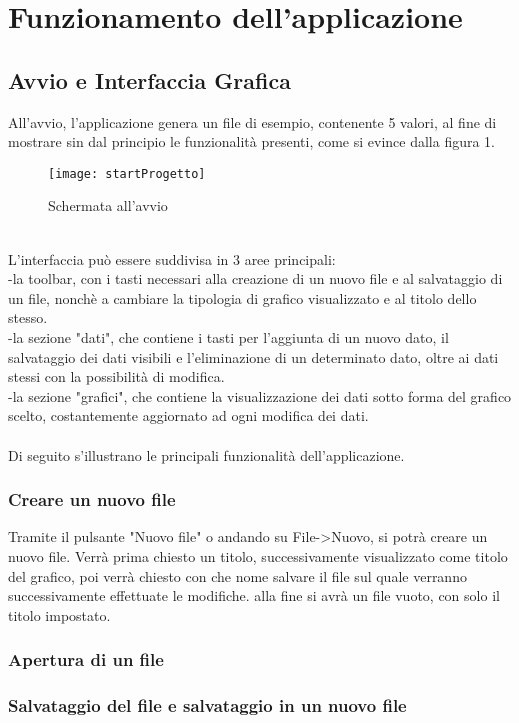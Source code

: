 \documentclass[10pt]{article}
\begin{document}
    \section{Funzionamento dell'applicazione}
    \subsection{Avvio e Interfaccia Grafica}
    All'avvio, l'applicazione genera un file di esempio, contenente 5 valori, al fine di mostrare sin dal principio le funzionalità presenti, come si evince dalla figura 1.
     \begin{figure}[h!]
     	\centering
     	\texttt{[image: startProgetto]}
     	\caption{Schermata all'avvio}
     	\label{fig:startprogetto}
     \end{figure}
 	\\
    L'interfaccia può essere suddivisa in 3 aree principali:\\
    -la toolbar, con i tasti necessari alla creazione di un nuovo file e al salvataggio di un file, nonchè a cambiare la tipologia di grafico visualizzato e al titolo dello stesso.\\
    -la sezione "dati", che contiene i tasti per l'aggiunta di un nuovo dato, il salvataggio dei dati visibili e l'eliminazione di un determinato dato, oltre ai dati stessi con la possibilità di modifica.\\
    -la sezione "grafici", che contiene la visualizzazione dei dati sotto forma del grafico scelto, costantemente aggiornato ad ogni modifica dei dati.\\\\
    Di seguito s'illustrano le principali funzionalità dell'applicazione.
    \subsubsection{Creare un nuovo file}
    Tramite il pulsante "Nuovo file" o andando su File->Nuovo, si potrà creare un nuovo file. Verrà prima chiesto un titolo, successivamente visualizzato come titolo del grafico, poi verrà chiesto con che nome salvare il file sul quale verranno successivamente effettuate le modifiche. alla fine si avrà un file vuoto, con solo il titolo impostato.
    \subsubsection{Apertura di un file}
    \subsubsection{Salvataggio del file e salvataggio in un nuovo file}
\end{document}
